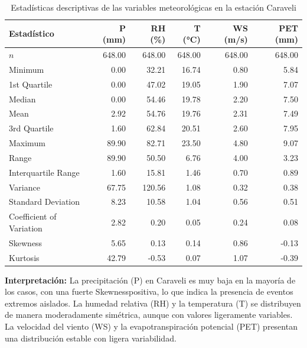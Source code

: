 \begin{table}[H]
\centering
\caption{Estadísticas descriptivas de las variables meteorológicas en la estación Caraveli}
\label{tab:stat_caraveli}
\scriptsize
\begin{tabular}{lrrrrr}
\toprule
\textbf{Estadístico} & \textbf{P (mm)} & \textbf{RH (\%)} & \textbf{T (°C)} & \textbf{WS (m/s)} & \textbf{PET (mm)} \\
\midrule
$n$    & 648.00 & 648.00 & 648.00 & 648.00 & 648.00 \\
Minimum                 & 0.00   & 32.21  & 16.74  & 0.80   & 5.84   \\
1st Quartile          & 0.00   & 47.02  & 19.05  & 1.90   & 7.07   \\
Median               & 0.00   & 54.46  & 19.78  & 2.20   & 7.50   \\
Mean                 & 2.92   & 54.76  & 19.76  & 2.31   & 7.49   \\
3rd Quartile           & 1.60   & 62.84  & 20.51  & 2.60   & 7.95   \\
Maximum                & 89.90  & 82.71  & 23.50  & 4.80   & 9.07   \\
Range                 & 89.90  & 50.50  & 6.76   & 4.00   & 3.23   \\
Interquartile Range  & 1.60   & 15.81  & 1.46   & 0.70   & 0.89   \\
Variance            & 67.75  & 120.56 & 1.08   & 0.32   & 0.38   \\
Standard Deviation          & 8.23   & 10.58  & 1.04   & 0.56   & 0.51   \\
Coefficient of Variation      & 2.82   & 0.20   & 0.05   & 0.24   & 0.08   \\
Skewness            & 5.65   & 0.13   & 0.14   & 0.86   & -0.13  \\
Kurtosis              & 42.79  & -0.53  & 0.07   & 1.07   & -0.39  \\
\bottomrule
\end{tabular}
\end{table}

\textbf{Interpretación:} La precipitación (P) en Caraveli es muy baja en la mayoría de los casos, con una fuerte Skewnesspositiva, lo que indica la presencia de eventos extremos aislados. La humedad relativa (RH) y la temperatura (T) se distribuyen de manera moderadamente simétrica, aunque con valores ligeramente variables. La velocidad del viento (WS) y la evapotranspiración potencial (PET) presentan una distribución estable con ligera variabilidad.

